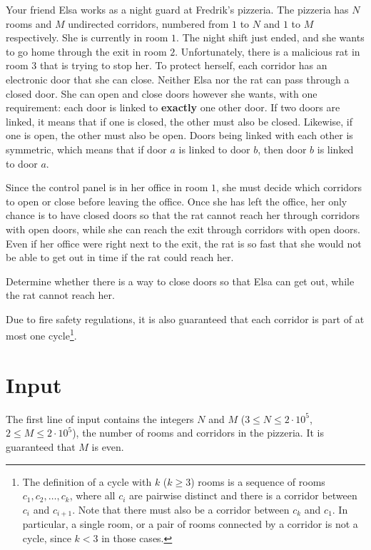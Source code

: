\noindent

Your friend Elsa works as a night guard at Fredrik's pizzeria.
The pizzeria has $N$ rooms and $M$ undirected corridors, numbered from $1$ to $N$ and $1$ to $M$ respectively.
She is currently in room $1$.
The night shift just ended, and she wants to go home through the exit in room $2$.
Unfortunately, there is a malicious rat in room $3$ that is trying to stop her.
To protect herself, each corridor has an electronic door that she can close.
Neither Elsa nor the rat can pass through a closed door.
She can open and close doors however she wants, with one requirement:
each door is linked to \textbf{exactly} one other door.
If two doors are linked, it means that if one is closed, the other must also be closed.
Likewise, if one is open, the other must also be open.
Doors being linked with each other is symmetric, which means that if door $a$ is linked to door $b$, then door $b$ is linked to door $a$.

Since the control panel is in her office in room $1$, she must decide which corridors to open or close before leaving the office.
Once she has left the office, her only chance is to have closed doors so that the rat cannot reach her through corridors with open doors, while she can reach the exit through corridors with open doors.
Even if her office were right next to the exit, the rat is so fast that she would not be able to get out in time if the rat could reach her.

Determine whether there is a way to close doors so that Elsa can get out, while the rat
cannot reach her.

Due to fire safety regulations, it is also guaranteed that each corridor is part of at most one cycle\footnote{The definition of a cycle with $k$ ($k \geq 3$) rooms is a sequence of rooms $c_1, c_2, \dots, c_k$, where all $c_i$ are pairwise distinct and there is a corridor between $c_i$ and $c_{i+1}$. Note that there must also be a corridor between $c_k$ and $c_1$. In particular, a single room, or a pair of rooms connected by a corridor is not a cycle, since $k < 3$ in those cases.}.

\section*{Input}
The first line of input contains the integers $N$ and $M$ ($3 \leq N \leq 2 \cdot 10^5$, $2 \leq M \leq 2 \cdot 10^5$),
the number of rooms and corridors in the pizzeria. It is guaranteed that $M$ is even.

